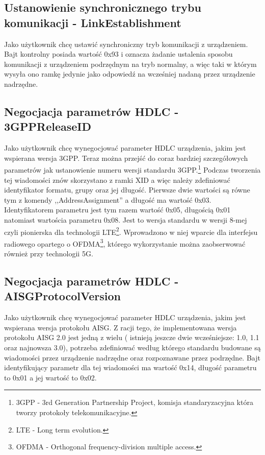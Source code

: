 		\subsection{Ustanowienie synchronicznego trybu komunikacji - LinkEstablishment}
			Jako użytkownik chcę ustawić synchroniczny tryb komunikacji z urządzeniem.
			\newline\newline
			Bajt kontrolny posiada wartość 0x93 i oznacza żadanie ustalenia sposobu komunikacji z urządzeniem podrzędnym na tryb normalny, a więc taki w którym wysyła ono ramkę jedynie jako odpowiedź
			na wcześniej nadaną przez urządzenie nadrzędne.
		 \subsection{Negocjacja parametrów HDLC - 3GPPReleaseID}
			Jako użytkownik chcę wynegocjować parameter HDLC urządzenia, jakim jest wspierana wersja 3GPP. \newline
			\newline\newline
			Teraz można przejść do coraz bardziej szczegółowych parametrów jak ustanowienie numeru wersji standardu 3GPP.\footnote{\label{3GPP} 3GPP - 3rd Generation Partnership Project, komisja standaryzacyjna która tworzy protokoły telekomunikacyjne.}
			Podczas tworzenia tej wiadomości znów skorzystano z ramki XID a więc należy zdefiniować identyfikator formatu, grupy oraz jej długość. Pierwsze dwie wartości są równe tym z komendy ,,AddressAssignment'' a długość ma wartość 0x03.
			Identyfikatorem parametru jest tym razem wartość 0x05, długością 0x01 natomiast wartościa parametru 0x08. Jest to wersja standardu w wersji 8-mej czyli pionierska dla technologii LTE\footnote{\label{LTE} LTE - Long term evolution.}.
			Wprowadzono w niej wparcie dla interfejsu radiowego opartego o OFDMA\footnote{\label{OFDMA} OFDMA - Orthogonal frequency-division multiple access.}, którego wykorzystanie można zaobserwować również przy technologii 5G.
		\subsection{Negocjacja parametrów HDLC - AISGProtocolVersion}
			Jako użytkownik chcę wynegocjować parameter HDLC urządzenia, jakim jest wspierana wersja protokołu AISG. \newline
			Z racji tego, że implementowana wersja protokołu AISG 2.0 jest jedną z wielu ( istnieją jeszcze dwie wcześniejsze: 1.0, 1.1 oraz najnowsza 3.0), potrzeba zdefiniować według którego standardu budowane są
			wiadomości przez urządzenie nadrzędne oraz rozpoznawane przez podrzędne.
			Bajt identyfikujący parametr dla tej wiadomości ma wartość 0x14, długość parametru to 0x01 a jej wartość to 0x02.
